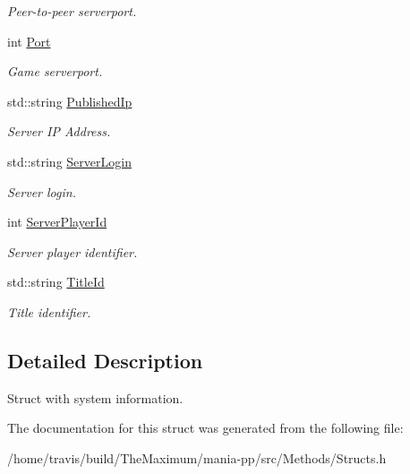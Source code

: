 \begin{DoxyCompactItemize}
\begin{DoxyCompactList}\small\item\em Peer-\/to-\/peer serverport. \end{DoxyCompactList}\item 
\hypertarget{structSystemInfo_a2fedd656ecae9e623482c5b17a2278c6}{int \hyperlink{structSystemInfo_a2fedd656ecae9e623482c5b17a2278c6}{Port}}\label{structSystemInfo_a2fedd656ecae9e623482c5b17a2278c6}

\begin{DoxyCompactList}\small\item\em Game serverport. \end{DoxyCompactList}\item 
\hypertarget{structSystemInfo_a81a7a474ee8b20aa4f73b4bd346c05d7}{std\-::string \hyperlink{structSystemInfo_a81a7a474ee8b20aa4f73b4bd346c05d7}{Published\-Ip}}\label{structSystemInfo_a81a7a474ee8b20aa4f73b4bd346c05d7}

\begin{DoxyCompactList}\small\item\em Server I\-P Address. \end{DoxyCompactList}\item 
\hypertarget{structSystemInfo_a7ddac6d99bc8a43171cf1feb8d4b4758}{std\-::string \hyperlink{structSystemInfo_a7ddac6d99bc8a43171cf1feb8d4b4758}{Server\-Login}}\label{structSystemInfo_a7ddac6d99bc8a43171cf1feb8d4b4758}

\begin{DoxyCompactList}\small\item\em Server login. \end{DoxyCompactList}\item 
\hypertarget{structSystemInfo_aeb8cb49c244fed751e0dc6e83128aafe}{int \hyperlink{structSystemInfo_aeb8cb49c244fed751e0dc6e83128aafe}{Server\-Player\-Id}}\label{structSystemInfo_aeb8cb49c244fed751e0dc6e83128aafe}

\begin{DoxyCompactList}\small\item\em Server player identifier. \end{DoxyCompactList}\item 
\hypertarget{structSystemInfo_ad4fb8ffe4a969e5e0d67d2dc343c3fae}{std\-::string \hyperlink{structSystemInfo_ad4fb8ffe4a969e5e0d67d2dc343c3fae}{Title\-Id}}\label{structSystemInfo_ad4fb8ffe4a969e5e0d67d2dc343c3fae}

\begin{DoxyCompactList}\small\item\em Title identifier. \end{DoxyCompactList}\end{DoxyCompactItemize}


\subsection{Detailed Description}
Struct with system information. 

The documentation for this struct was generated from the following file\-:\begin{DoxyCompactItemize}
\item 
/home/travis/build/\-The\-Maximum/mania-\/pp/src/\-Methods/Structs.\-h\end{DoxyCompactItemize}
